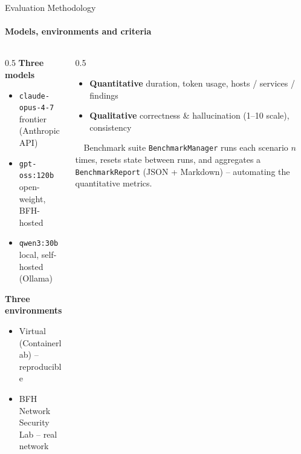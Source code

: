 \begin{frame}{Evaluation Methodology}
    \framesubtitle{Models, environments and criteria}

    \begin{columns}[T,onlytextwidth]
        \begin{column}{0.5\textwidth}
            \textbf{Three models}
            \begin{itemize}
                \item[\faCloud] \texttt{claude-opus-4-7} \scriptsize frontier (Anthropic API)
                \item[\faServer] \texttt{gpt-oss:120b} \scriptsize open-weight, BFH-hosted
                \item[\faMicrochip] \texttt{qwen3:30b} \scriptsize local, self-hosted (Ollama)
            \end{itemize}

            \vspace{0.5em}
            \textbf{Three environments}
            \begin{itemize}
                \item \scriptsize Virtual (Containerlab) -- reproducible
                \item \scriptsize BFH Network Security Lab -- real network
            \end{itemize}
        \end{column}

        \begin{column}{0.5\textwidth}
            \begin{itemize}
                \item \textbf{Quantitative} \scriptsize duration, token usage, hosts / services / findings
                \item \textbf{Qualitative} \scriptsize correctness \& hallucination (1--10 scale), consistency
            \end{itemize}

            \vspace{0.5em}
            \begin{block}{\faChartBar~~Benchmark suite}
                \scriptsize
                \texttt{BenchmarkManager} runs each scenario $n$ times, resets state between runs,
                and aggregates a \texttt{BenchmarkReport} (JSON + Markdown) -- automating the quantitative metrics.
            \end{block}
        \end{column}
    \end{columns}
\end{frame}
